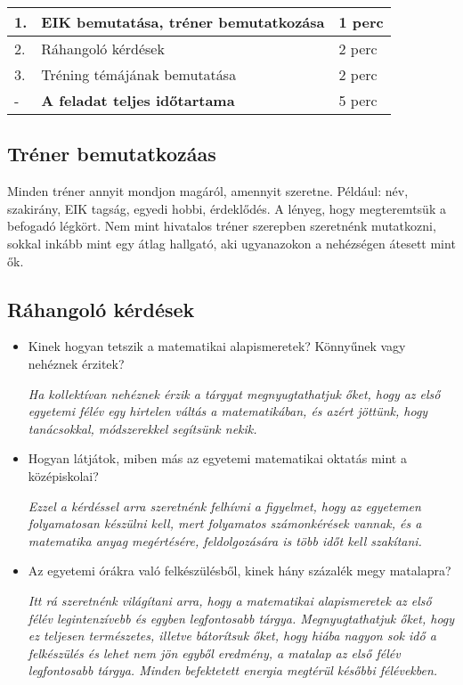 \documentclass[../Main.tex]{subfiles}
\begin{document}
\begin{center}
    \begin{tabular}{| m{1.3 em} | m{} | m{} |}
    \hline
    1. & EIK bemutatása, tréner bemutatkozása & 1 perc \\
    \hline
    2. & Ráhangoló kérdések & 2 perc \\
    \hline
    3. & Tréning témájának bemutatása & 2 perc \\
    \hline
    - & \textbf{A feladat teljes időtartama} & 5 perc \\
    \hline
    \end{tabular}
\end{center}

\subsection{Tréner bemutatkozáas}

\begin{flushleft}
    Minden tréner annyit mondjon magáról, amennyit szeretne. Például: név, szakirány, EIK tagság,
    egyedi hobbi, érdeklődés. A lényeg, hogy megteremtsük a befogadó légkört. Nem mint hivatalos
    tréner szerepben szeretnénk mutatkozni, sokkal inkább mint egy átlag hallgató, aki ugyanazokon
    a nehézségen átesett mint ők.
\end{flushleft}

\subsection{Ráhangoló kérdések}
\begin{itemize}
    \item Kinek hogyan tetszik a matematikai alapismeretek? Könnyűnek vagy nehéznek érzitek?
    
    \textit{Ha kollektívan nehéznek érzik a tárgyat megnyugtathatjuk őket, hogy az első egyetemi félév
    egy hirtelen váltás a matematikában, és azért jöttünk, hogy tanácsokkal, módszerekkel segítsünk nekik.}

    \item Hogyan látjátok, miben más az egyetemi matematikai oktatás mint a középiskolai?
    
    \textit{Ezzel a kérdéssel arra szeretnénk felhívni a figyelmet, hogy az egyetemen folyamatosan
    készülni kell, mert folyamatos számonkérések vannak, és a matematika anyag megértésére, feldolgozására
    is több időt kell szakítani.}

    \item Az egyetemi órákra való felkészülésből, kinek hány százalék megy matalapra?
    
    \textit{Itt rá szeretnénk világítani arra, hogy a matematikai alapismeretek az első félév legintenzívebb
    és egyben legfontosabb tárgya. Megnyugtathatjuk őket, hogy ez teljesen természetes, illetve bátorítsuk őket,
    hogy hiába nagyon sok idő a felkészülés és lehet nem jön egyből eredmény, a matalap az első félév legfontosabb
    tárgya. Minden befektetett energia megtérül későbbi félévekben.}
\end{itemize}
\end{document}
